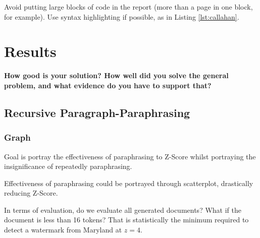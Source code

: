 \documentclass{l4proj}
\theoremstyle{definition}
\begin{document}

Avoid putting large blocks of code in the report (more than a page in one block, for example). Use syntax highlighting if possible, as in Listing \ref{lst:callahan}.

\chapter{Results} 
\textbf{How good is your solution? How well did you solve the general problem, and what evidence do you have to support that?}

\section{Recursive Paragraph-Paraphrasing}
    \subsection{Graph}
        Goal is portray the effectiveness of paraphrasing to Z-Score whilst portraying the insignificance of repeatedly paraphrasing.

        Effectiveness of paraphrasing could be portrayed through scatterplot, drastically reducing Z-Score. \newline 

        In terms of evaluation, do we evaluate all generated documents? What if the document is less than 16 tokens? That is statistically the minimum required to detect a watermark from Maryland at $z = 4$.
\end{document}
